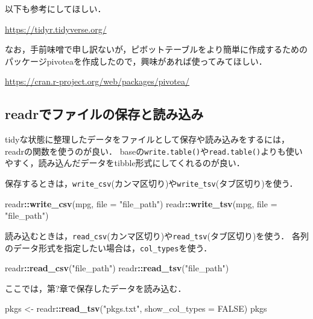 \documentclass[
]{article}
\newenvironment{Shaded}{\begin{snugshade}}{\end{snugshade}}
\newcommand{\AttributeTok}[1]{\textcolor[rgb]{0.13,0.29,0.53}{#1}}
\newcommand{\ConstantTok}[1]{\textcolor[rgb]{0.56,0.35,0.01}{#1}}
\newcommand{\FunctionTok}[1]{\textcolor[rgb]{0.13,0.29,0.53}{\textbf{#1}}}
\newcommand{\NormalTok}[1]{#1}
\newcommand{\OtherTok}[1]{\textcolor[rgb]{0.56,0.35,0.01}{#1}}
\newcommand{\SpecialCharTok}[1]{\textcolor[rgb]{0.81,0.36,0.00}{\textbf{#1}}}
\newcommand{\StringTok}[1]{\textcolor[rgb]{0.31,0.60,0.02}{#1}}
\begin{document}
以下も参考にしてほしい．

\url{https://tidyr.tidyverse.org/}

なお，手前味噌で申し訳ないが，ピボットテーブルをより簡単に作成するためのパッケージpivoteaを作成したので，興味があれば使ってみてほしい．

\url{https://cran.r-project.org/web/packages/pivotea/}

\hypertarget{readrux3067ux30d5ux30a1ux30a4ux30ebux306eux4fddux5b58ux3068ux8aadux307fux8fbcux307f}{%
\subsection{readrでファイルの保存と読み込み}\label{readrux3067ux30d5ux30a1ux30a4ux30ebux306eux4fddux5b58ux3068ux8aadux307fux8fbcux307f}}

tidyな状態に整理したデータをファイルとして保存や読み込みをするには，readrの関数を使うのが良い．
baseの\texttt{write.table()}や\texttt{read.table()}よりも使いやすく，読み込んだデータをtibble形式にしてくれるのが良い．

保存するときは，\texttt{write\_csv}(カンマ区切り)や\texttt{write\_tsv}(タブ区切り)を使う．

\begin{Shaded}
\begin{Highlighting}[]
\NormalTok{readr}\SpecialCharTok{::}\FunctionTok{write\_csv}\NormalTok{(mpg, }\AttributeTok{file =} \StringTok{"file\_path"}\NormalTok{)}
\NormalTok{readr}\SpecialCharTok{::}\FunctionTok{write\_tsv}\NormalTok{(mpg, }\AttributeTok{file =} \StringTok{"file\_path"}\NormalTok{)}
\end{Highlighting}
\end{Shaded}

読み込むときは，\texttt{read\_csv}(カンマ区切り)や\texttt{read\_tsv}(タブ区切り)を使う．
各列のデータ形式を指定したい場合は，\texttt{col\_types}を使う．

\begin{Shaded}
\begin{Highlighting}[]
\NormalTok{readr}\SpecialCharTok{::}\FunctionTok{read\_csv}\NormalTok{(}\StringTok{"file\_path"}\NormalTok{)}
\NormalTok{readr}\SpecialCharTok{::}\FunctionTok{read\_tsv}\NormalTok{(}\StringTok{"file\_path"}\NormalTok{)}
\end{Highlighting}
\end{Shaded}

ここでは，第?章で保存したデータを読み込む．

\begin{Shaded}
\begin{Highlighting}[]
\NormalTok{pkgs }\OtherTok{\textless{}{-}}\NormalTok{ readr}\SpecialCharTok{::}\FunctionTok{read\_tsv}\NormalTok{(}\StringTok{"pkgs.txt"}\NormalTok{, }\AttributeTok{show\_col\_types =} \ConstantTok{FALSE}\NormalTok{)}
\NormalTok{pkgs}
\end{Highlighting}
\end{Shaded}
\end{document}

